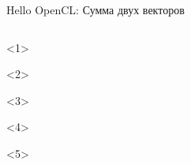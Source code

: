 \documentclass[@BEAMER_OPTIONS@]{beamer}
\begin{document}
\begin{frame}[fragile]{Hello OpenCL: Сумма двух векторов}
\begin{columns}
\begin{column}{0.7\textwidth}
            \begin{minipage}[c][\textheight][c]{\linewidth}
                \begin{exampleblock}{\small%
                    }
                    \begin{adjustbox}{width=0.7\textwidth, height=\textheight, keepaspectratio}
                        \begin{minipage}{\textwidth}
                            \begin{onlyenv}<1>
                                
                            \end{onlyenv}
                            \begin{onlyenv}<2>
                                
                            \end{onlyenv}
                            \begin{onlyenv}<3>
                                
                            \end{onlyenv}
                            \begin{onlyenv}<4>
                                
                            \end{onlyenv}
                            \begin{onlyenv}<5>
                                
                            \end{onlyenv}
                        \end{minipage}
                    \end{adjustbox}
                \end{exampleblock}
            \end{minipage}
        \end{column}
    \end{columns}
\end{frame}
\end{document}
